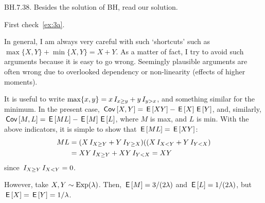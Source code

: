 \begin{exercise}
BH.7.38. Besides the solution of BH, read our solution.
\begin{solution}
First check~\cref{ex:3a}.

In general, I am always very careful with such `shortcuts' such as $\max\{X,Y\} + \min\{X, Y\} = X +Y$.  As a matter of fact, I try to avoid such arguments because it is easy to go wrong. Seemingly plausible arguments are often wrong due to overlooked dependency or non-linearity (effects of higher moments).

It is useful to write $\max\{x,y\} = x\,I_{x\geq y}+y\,I_{y>x}$, and something similar for the minimum. In the present case, $\,\mathsf{Cov}\left[X,Y\right] = \,\mathsf{E}\left[X Y\right]-\,\mathsf{E}\left[X\right] \,\mathsf{E}\left[Y\right]$, and, similarly, $\,\mathsf{Cov}\left[M,L\right] = \,\mathsf{E}\left[ML\right]- \,\mathsf{E}\left[M\right] \,\mathsf{E}\left[L\right]$, where $M$ is max, and $L$ is min. With the above indicators, it is simple to show that $\,\mathsf{E}\left[ML\right] = \,\mathsf{E}\left[X Y\right]$:
\begin{align*}
 ML
  &= (X\,I_{X\geq Y} + Y\,I_{Y\geq X})((X\,I_{X<Y} + Y\,I_{Y<X}) \\
  &= XY\,I_{X\geq Y} + XY\,I_{Y<X} = XY
\end{align*}
since $\,I_{X\geq Y}\,I_{X<Y} =0$.

However, take $X,Y\sim \mathrm{Exp}(\lambda)$. Then, $\,\mathsf{E}\left[M\right] = 3/(2\lambda)$ and $\,\mathsf{E}\left[L\right]= 1/(2\lambda)$, but $\,\mathsf{E}\left[X\right] = \,\mathsf{E}\left[Y\right] = 1/\lambda$.
\end{solution}
\end{exercise}

